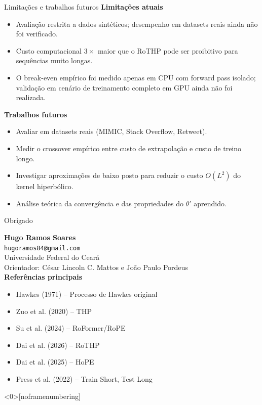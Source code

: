 \documentclass[aspectratio=169]{beamer}
\begin{document}
\begin{frame}{Limitações e trabalhos futuros}
  \textbf{Limitações atuais}
  \begin{itemize}
    \item Avaliação restrita a dados sintéticos; desempenho em datasets
          reais ainda não foi verificado.
    \item Custo computacional $3\times$ maior que o RoTHP pode ser
          proibitivo para sequências muito longas.
    \item O break-even empírico foi medido apenas em CPU com forward pass
          isolado; validação em cenário de treinamento completo em GPU
          ainda não foi realizada.
  \end{itemize}
  \vspace{0.4em}
  \textbf{Trabalhos futuros}
  \begin{itemize}
    \item Avaliar em datasets reais (MIMIC, Stack Overflow, Retweet).
    \item Medir o crossover empírico entre custo de extrapolação e custo
          de treino longo.
    \item Investigar aproximações de baixo posto para reduzir o custo
          $O(L^2)$ do kernel hiperbólico.
    \item Análise teórica da convergência e das propriedades do $\theta'$
          aprendido.
  \end{itemize}
\end{frame}

\begin{frame}{Obrigado}
  \begin{center}
    \large
    \textbf{Hugo Ramos Soares} \\
    \normalsize
    \texttt{hugoramos84@gmail.com} \\[1em]
    Universidade Federal do Ceará \\
    Orientador: César Lincoln C. Mattos e João Paulo Pordeus \\[1.5em]
    \textbf{Referências principais}
  \end{center}
  \begin{itemize}
    \item Hawkes (1971) -- Processo de Hawkes original
    \item Zuo et al. (2020) -- THP
    \item Su et al. (2024) -- RoFormer/RoPE
    \item Dai et al. (2026) -- RoTHP
    \item Dai et al. (2025) -- HoPE
    \item Press et al. (2022) -- Train Short, Test Long
  \end{itemize}
\end{frame}

\begin{frame}<0>[noframenumbering]{}
  
  
\end{frame}
\end{document}
